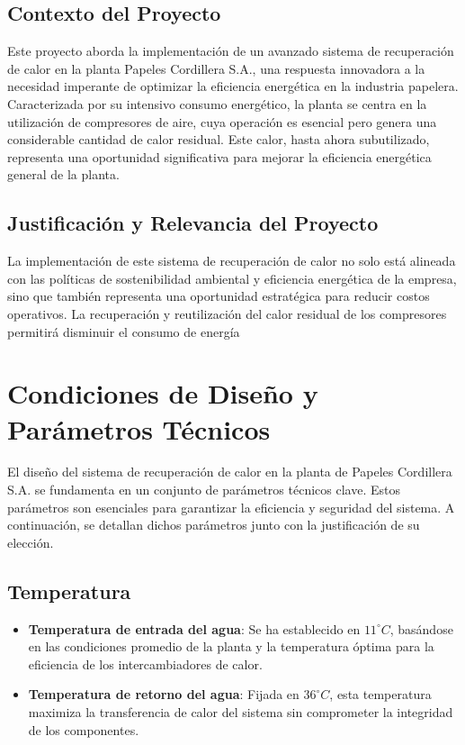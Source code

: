 \documentclass[11pt,a4paper]{article}  %
\begin{document}
\subsection{Contexto del Proyecto}
Este proyecto aborda la implementación de un avanzado sistema de recuperación de calor en la planta Papeles Cordillera S.A., una respuesta innovadora a la necesidad imperante de optimizar la eficiencia energética en la industria papelera. Caracterizada por su intensivo consumo energético, la planta se centra en la utilización de compresores de aire, cuya operación es esencial pero genera una considerable cantidad de calor residual. Este calor, hasta ahora subutilizado, representa una oportunidad significativa para mejorar la eficiencia energética general de la planta.

\subsection{Justificación y Relevancia del Proyecto}
La implementación de este sistema de recuperación de calor no solo está alineada con las políticas de sostenibilidad ambiental y eficiencia energética de la empresa, sino que también representa una oportunidad estratégica para reducir costos operativos. La recuperación y reutilización del calor residual de los compresores permitirá disminuir el consumo de energía\section{Condiciones de Diseño y Parámetros Técnicos}

El diseño del sistema de recuperación de calor en la planta de Papeles Cordillera S.A. se fundamenta en un conjunto de parámetros técnicos clave. Estos parámetros son esenciales para garantizar la eficiencia y seguridad del sistema. A continuación, se detallan dichos parámetros junto con la justificación de su elección.

\subsection{Temperatura}
\begin{itemize}
    \item \textbf{Temperatura de entrada del agua}: Se ha establecido en \(11^\circ C\), basándose en las condiciones promedio de la planta y la temperatura óptima para la eficiencia de los intercambiadores de calor.
    \item \textbf{Temperatura de retorno del agua}: Fijada en \(36^\circ C\), esta temperatura maximiza la transferencia de calor del sistema sin comprometer la integridad de los componentes.
\end{itemize}
\end{document}
